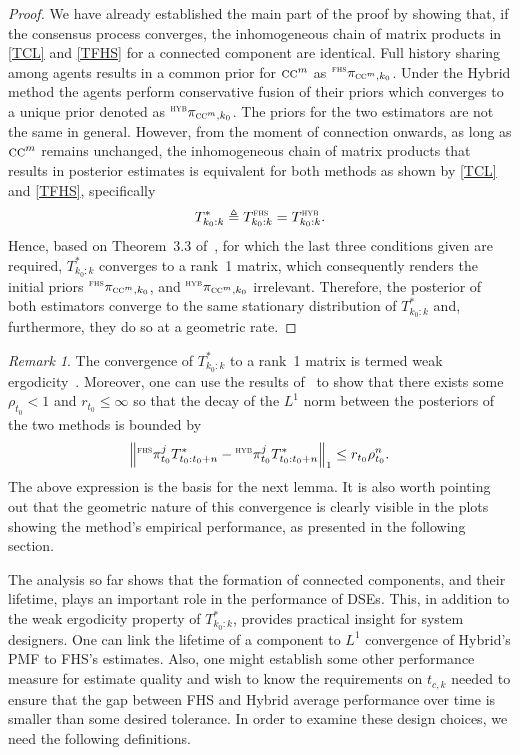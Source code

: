 \documentclass[journal]{IEEEtran}
\theoremstyle{remark}
\newtheorem{remark}{Remark}
\newcommand{\suf}[1]{\textsc{\tiny #1}}  %
\theoremstyle{definition}
\begin{document}
\begin{proof}
We have already established the main part of the proof by showing that, if the
consensus process converges, the inhomogeneous chain of matrix products in
\eqref{TCL} and \eqref{TFHS} for a connected component are identical. 
Full history sharing among agents results in a common prior
for $\textsc{cc}^m$ as ${}^\suf{FHS}\pi_{{\textsc{cc}^m},k_0}$. Under the Hybrid method the
agents perform conservative fusion of their priors which converges to a unique
prior denoted as ${}^\suf{HYB}\pi_{{\textsc{cc}^m},k_0}$. The priors for the two estimators
are not the same in general. However, from the moment of connection onwards, as
long as $\textsc{cc}^m$ remains unchanged, the inhomogeneous chain of matrix
products
that results in posterior estimates is equivalent for both methods as shown
by \eqref{TCL} and \eqref{TFHS}, specifically\\ $${T}_{k_0:k}^*  \triangleq
{T}_{k_0:k}^{\suf{FHS}}={T}_{k_0:k}^{\suf{HYB}}.$$ Hence, based on Theorem~3.3
of~\cite{seneta2006non}, for which the last three conditions given are required,
${T}_{k_0:k}^*$ converges to a rank~1 matrix, which consequently renders the
initial priors ${}^\suf{FHS}\pi_{{\textsc{cc}^m},k_0}$, and ${}^\suf{HYB}\pi_{{\textsc{cc}^m},k_0}$
irrelevant. Therefore, the posterior of both estimators converge to the same
stationary distribution of ${T}_{k_0:k}^*$ and, furthermore, they do so at a geometric rate.
\end{proof}

\begin{remark}
\label{rem:ergodicity}
The convergence of ${T}_{k_0:k}^*$ to a rank~1 matrix is termed weak
ergodicity~\cite{seneta2006non,anderson1997forgetting}. Moreover, one can use
the results of~\cite{liverani1999probabilistic} to show 
that there exists some $\rho_{t_0} < 1$ and $ r_{t_0}\le \infty$ so that  
the decay of the $L^1$ norm between the
posteriors of the two methods is bounded by
$$\left\|{}^\suf{FHS}\pi^j_{t_0} {T}_{t_0:t_0+n}^* - {}^\suf{HYB}\pi^j_{t_0} {T}_{t_0:t_0+n}^* \right\|_1 \leq r_{t_0}\rho_{t_0}^{n}.$$ 
The above expression is the basis for the next lemma. 
It is also worth pointing out that the geometric nature of this convergence is clearly visible in the
plots showing the method's empirical performance, as  presented in the following section.
\end{remark}

The analysis so far shows that the formation of connected components, and their lifetime, plays an important role in the performance of DSEs. 
This, in addition to the weak ergodicity property of ${T}_{k_0:k}^*$, provides practical insight for system designers. 
One can link the lifetime of a component to $L^1$ convergence of Hybrid's PMF to FHS's estimates. 
Also, one might establish some other performance measure for estimate quality and wish to know the requirements on $t_{c,k}$ needed to ensure that the gap between FHS and Hybrid average performance over time is smaller than some desired tolerance. 
In order to examine these design choices, we need the following definitions.
\end{document}
